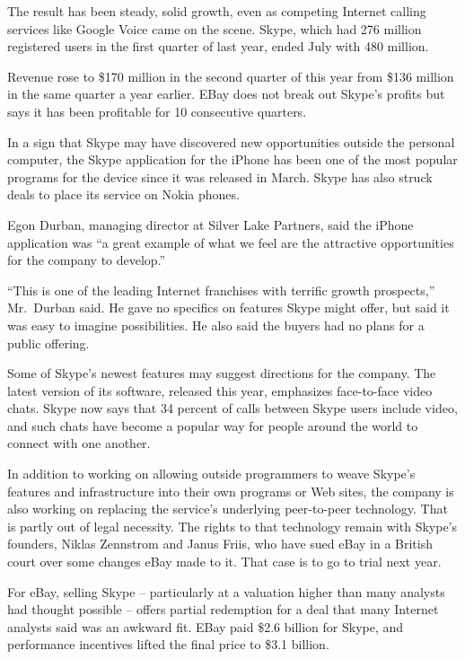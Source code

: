 ﻿\documentclass[12pt]{article}
\begin{document}
The result has been steady, solid growth, even as competing Internet calling services like Google
Voice came on the scene. Skype, which had 276 million registered users in the first quarter of last
year, ended July with 480 million.

Revenue rose to \$170 million in the second quarter of this year from \$136 million in the same
quarter a year earlier. EBay does not break out Skype's profits but says it has been profitable for
10 consecutive quarters.

In a sign that Skype may have discovered new opportunities outside the personal computer, the Skype
application for the iPhone has been one of the most popular programs for the device since it was
released in March. Skype has also struck deals to place its service on Nokia phones.

Egon Durban, managing director at Silver Lake Partners, said the iPhone application was ``a great
example of what we feel are the attractive opportunities for the company to develop.''

``This is one of the leading Internet franchises with terrific growth prospects,'' Mr.~Durban said.
He gave no specifics on features Skype might offer, but said it was easy to imagine possibilities.
He also said the buyers had no plans for a public offering.

Some of Skype's newest features may suggest directions for the company. The latest version of its
software, released this year, emphasizes face-to-face video chats. Skype now says that 34 percent of
calls between Skype users include video, and such chats have become a popular way for people around
the world to connect with one another.

In addition to working on allowing outside programmers to weave Skype's features and infrastructure
into their own programs or Web sites, the company is also working on replacing the service's
underlying peer-to-peer technology. That is partly out of legal necessity. The rights to that
technology remain with Skype's founders, Niklas Zennstrom and Janus Friis, who have sued eBay in a
British court over some changes eBay made to it. That case is to go to trial next year.

For eBay, selling Skype -- particularly at a valuation higher than many analysts had thought
possible -- offers partial redemption for a deal that many Internet analysts said was an awkward
fit. EBay paid \$2.6 billion for Skype, and performance incentives lifted the final price to \$3.1
billion.
\end{document}
